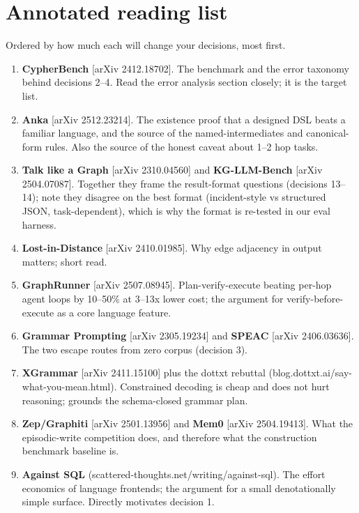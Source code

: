 \documentclass[11pt]{article}
\begin{document}
\section{Annotated reading list}

Ordered by how much each will change your decisions, most first.

\begin{enumerate}[leftmargin=1.6em,itemsep=3pt]
  \item \textbf{CypherBench} [arXiv 2412.18702]. The benchmark and the error taxonomy behind decisions 2--4. Read the error analysis section closely; it is the target list.
  \item \textbf{Anka} [arXiv 2512.23214]. The existence proof that a designed DSL beats a familiar language, and the source of the named-intermediates and canonical-form rules. Also the source of the honest caveat about 1--2 hop tasks.
  \item \textbf{Talk like a Graph} [arXiv 2310.04560] and \textbf{KG-LLM-Bench} [arXiv 2504.07087]. Together they frame the result-format questions (decisions 13--14); note they disagree on the best format (incident-style vs structured JSON, task-dependent), which is why the format is re-tested in our eval harness.
  \item \textbf{Lost-in-Distance} [arXiv 2410.01985]. Why edge adjacency in output matters; short read.
  \item \textbf{GraphRunner} [arXiv 2507.08945]. Plan-verify-execute beating per-hop agent loops by 10--50\% at 3--13x lower cost; the argument for verify-before-execute as a core language feature.
  \item \textbf{Grammar Prompting} [arXiv 2305.19234] and \textbf{SPEAC} [arXiv 2406.03636]. The two escape routes from zero corpus (decision 3).
  \item \textbf{XGrammar} [arXiv 2411.15100] plus the dottxt rebuttal (blog.dottxt.ai/say-what-you-mean.html). Constrained decoding is cheap and does not hurt reasoning; grounds the schema-closed grammar plan.
  \item \textbf{Zep/Graphiti} [arXiv 2501.13956] and \textbf{Mem0} [arXiv 2504.19413]. What the episodic-write competition does, and therefore what the construction benchmark baseline is.
  \item \textbf{Against SQL} (scattered-thoughts.net/writing/against-sql). The effort economics of language frontends; the argument for a small denotationally simple surface. Directly motivates decision 1.

\end{enumerate}
\end{document}
